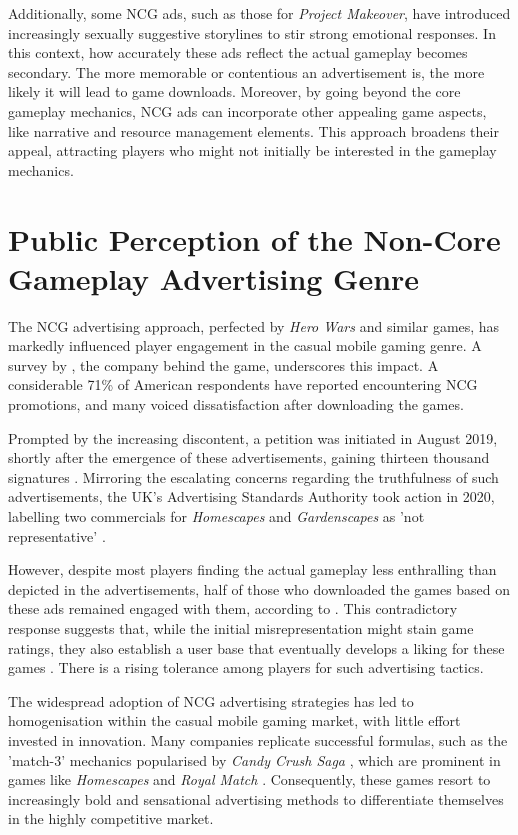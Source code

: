 \documentclass[a4paper, 12pt, mla]{homework}
\begin{document}
Additionally, some NCG ads, such as those for \textit{Project Makeover}, have introduced increasingly sexually suggestive storylines to stir strong emotional responses. 
In this context, how accurately these ads reflect the actual gameplay becomes secondary. 
The more memorable or contentious an advertisement is, the more likely it will lead to game downloads.
Moreover, by going beyond the core gameplay mechanics, NCG ads can incorporate other appealing game aspects, like narrative and resource management elements. 
This approach broadens their appeal, attracting players who might not initially be interested in the gameplay mechanics.

\section*{Public Perception of the Non-Core Gameplay Advertising Genre}
The NCG advertising approach, perfected by \textit{Hero Wars} and similar games, has markedly influenced player engagement in the casual mobile gaming genre. 
A survey by , the company behind the game, underscores this impact. 
A considerable 71\% of American respondents have reported encountering NCG promotions, and many voiced dissatisfaction after downloading the games.

Prompted by the increasing discontent, a petition was initiated in August 2019, shortly after the emergence of these advertisements, gaining thirteen thousand signatures \cite{WB:Hughes2019}.
Mirroring the escalating concerns regarding the truthfulness of such advertisements, the UK's Advertising Standards Authority took action in 2020, labelling two commercials for \textit{Homescapes} and \textit{Gardenscapes} as 'not representative' \cite{WB:BBC2020,DG:Homescapes,DG:Gardenscapes}.

However, despite most players finding the actual gameplay less enthralling than depicted in the advertisements, half of those who downloaded the games based on these ads remained engaged with them, according to . 
This contradictory response suggests that, while the initial misrepresentation might stain game ratings, they also establish a user base that eventually develops a liking for these games \cite{RA:Mago2020}.
There is a rising tolerance among players for such advertising tactics.

The widespread adoption of NCG advertising strategies has led to homogenisation within the casual mobile gaming market, with little effort invested in innovation. 
Many companies replicate successful formulas, such as the 'match-3' mechanics popularised by \textit{Candy Crush Saga} \cite{DG:CandyCrush}, which are prominent in games like \textit{Homescapes} and \textit{Royal Match} \cite{DG:RoyalMatch}. Consequently, these games resort to increasingly bold and sensational advertising methods to differentiate themselves in the highly competitive market.
\end{document}
